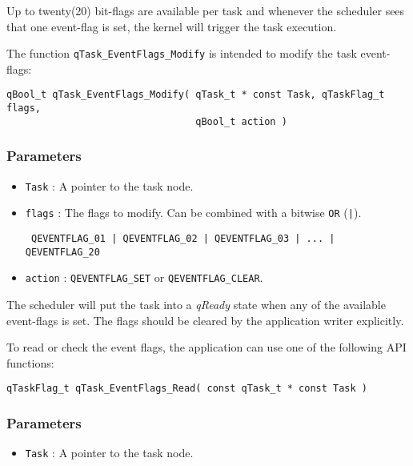 Up to twenty(20) bit-flags are available per task and whenever the scheduler sees that one event-flag is set, the kernel will trigger the task execution.

The function \lstinline{qTask_EventFlags_Modify} is intended to modify the task event-flags: 
\medskip

\begin{lstlisting}[style=CStyle]
qBool_t qTask_EventFlags_Modify( qTask_t * const Task, qTaskFlag_t flags, 
                                 qBool_t action )
\end{lstlisting} 

\subsubsection*{Parameters}
\begin{itemize}
    \item \lstinline{Task} : A pointer to the task node.
    \item \lstinline{flags} : The flags to modify. Can be combined with a bitwise \lstinline{OR} (\lstinline{|}).
    
    \lstinline{ QEVENTFLAG_01 | QEVENTFLAG_02 | QEVENTFLAG_03 | ... | QEVENTFLAG_20 }
    \item \lstinline{action} : \lstinline{QEVENTFLAG_SET} or \lstinline{QEVENTFLAG_CLEAR}. 
\end{itemize}

\noindent\hrulefill
\medskip

\begin{tcolorbox}
\HandRight The scheduler will put the task into a \textit{qReady} state when any of the available event-flags is set. The flags should be cleared by the application writer explicitly. 
\end{tcolorbox}

To read or check the event flags, the application can use one of the following API functions: 
\medskip

\begin{lstlisting}[style=CStyle]
qTaskFlag_t qTask_EventFlags_Read( const qTask_t * const Task )
\end{lstlisting} 

\subsubsection*{Parameters}
\begin{itemize}
    \item \lstinline{Task} : A pointer to the task node.
\end{itemize}

